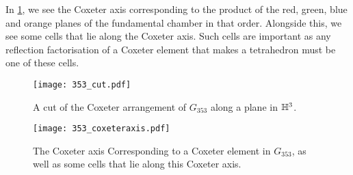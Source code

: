 In \cref{fig:353_coxeter_axis}, we see the Coxeter axis corresponding to the product of the red, green, blue and orange planes of the fundamental chamber in that order.
Alongside this, we see some cells that lie along the Coxeter axis.
Such cells are important as any reflection factorisation of a Coxeter element that makes a tetrahedron must be one of these cells.

\begin{figure}
	\centering
	\begin{minipage}{.5\textwidth}
		\centering
		\texttt{[image: 353\_cut.pdf]}
		\caption{A cut of the Coxeter arrangement of $G_{353}$ along a plane in $\mathbb{H}^3$.}
		\label{fig:353_cut}
	\end{minipage}%
	\begin{minipage}{.5\textwidth}
		\centering
		\texttt{[image: 353\_coxeteraxis.pdf]}
		\caption{The Coxeter axis Corresponding to a Coxeter element in $G_{353}$, as well as some cells that lie along this Coxeter axis.}
		\label{fig:353_coxeter_axis}
	\end{minipage}
\end{figure}

